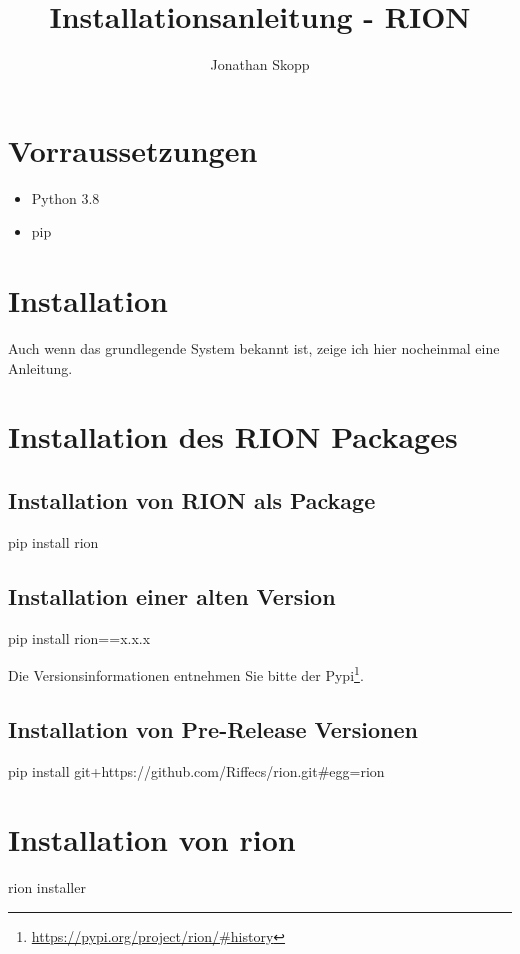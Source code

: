 \documentclass[fleqn,10pt]{olplainarticle}
\title{Installationsanleitung - RION}
\author[1]{Jonathan Skopp}
\affil[1]{jonathan-erik.skopp@tu-ilmenau.de}
\begin{document}
\flushbottom
\maketitle
\thispagestyle{empty}

\section{Vorraussetzungen}
\begin{itemize}
    \item Python 3.8
    \item pip 
\end{itemize}

\section{Installation}
Auch wenn das grundlegende System bekannt ist, zeige ich hier nocheinmal eine Anleitung.


\section{Installation des RION Packages}
\subsection{Installation von RION als Package}
\begin{listings}
pip install rion
\end{listings}
\subsection{Installation einer alten Version}
\begin{listings}
pip install rion==x.x.x
\end{listings}
Die Versionsinformationen entnehmen Sie bitte der Pypi\footnote{\url{https://pypi.org/project/rion/#history}}.
\subsection{Installation von Pre-Release Versionen}
\begin{listings}
pip install git+https://github.com/Riffecs/rion.git#egg=rion

\end{listings}


\section{Installation von rion}
\begin{listings}
rion installer
\end{listings}
\end{document}
